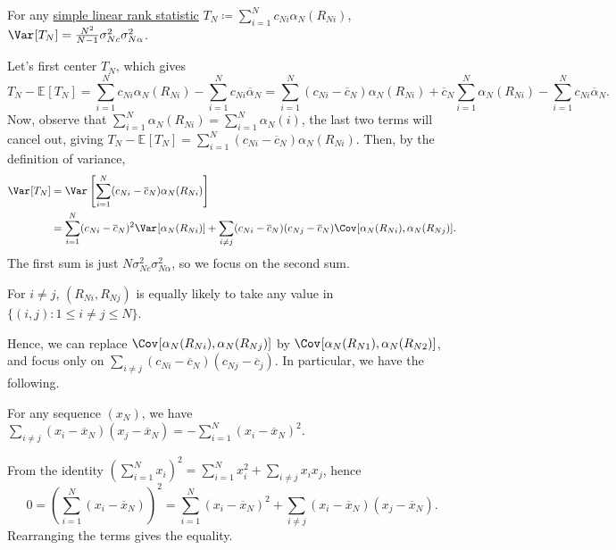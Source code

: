 \begin{claim}
	For any \hyperref[def:simple-linrea-rank-statistic]{simple linear rank statistic} \(T_N \coloneqq \sum_{i=1}^{N} c_{Ni} \alpha _N (R_{Ni})\), \(\Var_{}[T_N] = \frac{N^2}{N-1} \sigma _{Nc}^2 \sigma _{N \alpha }^2\).
\end{claim}
\begin{explanation}
	Let's first center \(T_N\), which gives
	\[
		T_N - \mathbb{E}_{}[T_N]
		= \sum_{i=1}^{N} c_{Ni} \alpha _N(R_{Ni}) - \sum_{i=1}^{N} c_{Ni} \overline{\alpha} _N
		= \sum_{i=1}^{N} (c_{Ni} - \overline{c} _N) \alpha _N(R_{Ni}) + \overline{c} _N \sum_{i=1}^{N} \alpha _N(R_{Ni}) - \sum_{i=1}^{N} c_{Ni} \overline{\alpha} _N .
	\]
	Now, observe that \(\sum_{i=1}^{N} \alpha _N(R_{Ni}) = \sum_{i=1}^{N} \alpha _N(i)\), the last two terms will cancel out, giving \(T_N - \mathbb{E}_{}[T_N] = \sum_{i=1}^{N} (c_{Ni} - \overline{c} _N) \alpha _N(R_{Ni})\). Then, by the definition of variance,
	\[
		\begin{split}
			\Var_{}[T_N]
			 & = \Var_{}\left[\sum_{i=1}^{N} (c_{Ni} - \overline{c} _N) \alpha _N(R_{Ni})\right]                                                                                                               \\
			 & = \sum_{i=1}^{N} (c_{Ni} - \overline{c} _N)^2 \Var_{}[\alpha _N(R_{Ni})] + \sum_{i \neq j} (c_{Ni} - \overline{c} _N)(c_{Nj} - \overline{c} _N) \Cov_{}[\alpha _N(R_{Ni}) , \alpha _N(R_{Nj})].
		\end{split}
	\]
	The first sum is just \(N \sigma _{Nc}^2 \sigma _{N \alpha }^2\), so we focus on the second sum.

	\begin{intuition}
		For \(i \neq j\), \((R_{Ni}, R_{Nj})\) is equally likely to take any value in \(\{ (i, j) \colon 1 \leq i \neq j \leq N\}\).
	\end{intuition}

	Hence, we can replace \(\Cov_{}[\alpha _N(R_{Ni}), \alpha _N(R_{Nj})] \) by \(\Cov_{}[\alpha _N(R_{N1}), \alpha _N(R_{N2})]\), and focus only on \(\sum_{i \neq j} (c_{Ni} - \overline{c} _N)(c_{Nj}- \overline{c} _j)\). In particular, we have the following.

	\begin{note}
		For any sequence \((x_N)\), we have \(\sum_{i \neq j} (x_i - \overline{x} _N)(x_j - \overline{x} _N) = - \sum_{i=1}^{N} (x_i - \overline{x} _N)^2\).
	\end{note}
	\begin{explanation}
		From the identity \(( \sum_{i=1}^{N} x_i ) ^2 = \sum_{i=1}^{N} x_i^2 + \sum_{i \neq j} x_i x_j \), hence
		\[
			0
			= \left( \sum_{i=1}^{N} (x_i - \overline{x} _N) \right) ^2
			= \sum_{i=1}^{N} (x_i - \overline{x} _N)^2 + \sum_{i \neq j} (x_i - \overline{x} _N)(x_j - \overline{x} _N).
		\]
		Rearranging the terms gives the equality.
	\end{explanation}


\end{explanation}
